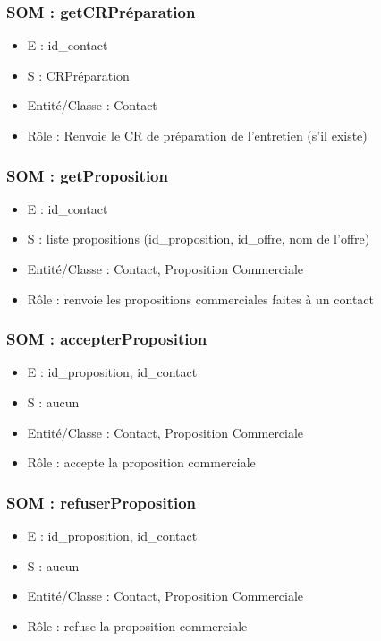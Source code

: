 \subsubsection{SOM : getCRPréparation}
	\begin{itemize}
		\item E : id\_contact
		\item S : CRPréparation
		\item Entité/Classe : Contact
		\item Rôle : Renvoie le CR de préparation de l’entretien (s’il existe)
	\end{itemize}

\subsubsection{SOM : getProposition}
	\begin{itemize}
		\item E : id\_contact
		\item S : liste propositions (id\_proposition, id\_offre, nom de l’offre)
		\item Entité/Classe : Contact, Proposition Commerciale
		\item Rôle : renvoie les propositions commerciales faites à un contact
	\end{itemize}

\subsubsection{SOM : accepterProposition}
	\begin{itemize}
		\item E : id\_proposition, id\_contact
		\item S : aucun
		\item Entité/Classe : Contact, Proposition Commerciale
		\item Rôle : accepte la proposition commerciale
	\end{itemize}

\subsubsection{SOM : refuserProposition}
	\begin{itemize}
		\item E : id\_proposition, id\_contact
		\item S : aucun
		\item Entité/Classe : Contact, Proposition Commerciale
		\item Rôle : refuse la proposition commerciale
	\end{itemize}

